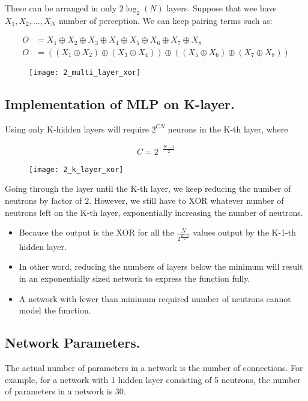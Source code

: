 These can be arranged in only $2\log_2(N)$ layers. Suppose that wee have $X_1, X_2, ..., X_N$ number of perception. We can keep pairing terms such as:

\begin{align}
	O &= X_1 \oplus X_2 \oplus X_3 \oplus X_4 \oplus X_5 \oplus X_6 \oplus X_7 \oplus X_8\\
	O &= ((X_1 \oplus X_2) \oplus (X_3 \oplus X_4)) \oplus ((X_5 \oplus X_6) \oplus (X_7 \oplus X_8))
\end{align}

\begin{figure}[H]
	\centering
	\texttt{[image: 2\_multi\_layer\_xor]}
\end{figure}

\subsection{Implementation of MLP on K-layer.}
Using only K-hidden layers will require $2^{CN}$ neurons in the K-th layer, where

\begin{align}
	C = 2^{-\frac{K-1}{2}}
\end{align}

\begin{figure}[H]
	\centering
	\texttt{[image: 2\_k\_layer\_xor]}
\end{figure}

\hfill\break
Going through the layer until the K-th layer, we keep reducing the number of neutrons by factor of $2$. However, we still have to XOR whatever number of neutrons left on the K-th layer, exponentially increasing the number of neutrons.

\begin{itemize}
	\item Because the output is the XOR for all the $\frac{N}{2^{\frac{K-1}{2}}}$ values output by the K-1-th hidden layer.
	\item In other word, reducing the numbers of layers below the minimum will result in an exponentially sized network to express the function fully.
	\item A network with fewer than minimum required number of neutrons cannot model the function.
\end{itemize}

\subsection{Network Parameters.}
The actual number of parameters in a network is the number of connections. For example, for a network with 1 hidden layer consisting of 5 neutrons, the number of parameters in a network is 30.

